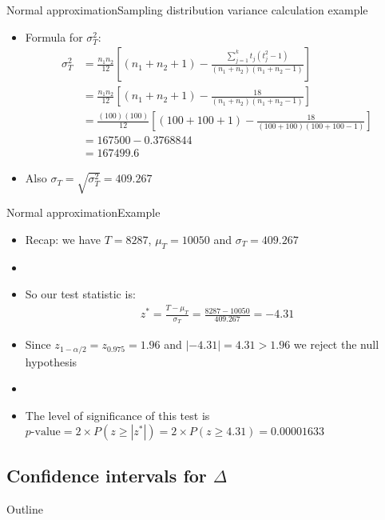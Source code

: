 \documentclass[xcolor=dvipsnames]{beamer}
\begin{document}
\begin{frame}{Normal approximation}{Sampling distribution variance calculation example}
\begin{itemize}
	\item Formula for $\sigma_T^{2}$: 	
	\begin{align*}
	\sigma_T^{2} &= \frac{n_1 n_2}{12}\left[(n_1 +n_2 +1)- \frac{\sum_{j=1}^k t_j (t_j^2-1)}{(n_1+n_2)(n_1+n_2-1)}\right] \\
	&= \frac{n_1 n_2}{12}\left[(n_1 +n_2 +1)- \frac{18}{(n_1+n_2)(n_1+n_2-1)}\right] \\
	&= \frac{(100)(100)}{12}\left[(100 + 100 +1)- \frac{18}{(100+100)(100+100-1)}\right] \\
	&= 167500 - 0.3768844 \\
	&= 167499.6
	\end{align*}
	\item Also $\sigma_T = \sqrt{\sigma_T^2} = 409.267$
\end{itemize}
\end{frame}

\begin{frame}{Normal approximation}{Example}
	\begin{itemize}
		\item Recap: we have $T = 8287$, $\mu_T = 10050$ and $\sigma_T = 409.267$
		\item[]
		\item So our test statistic is:
		\begin{align*}
			z^* =\frac{T- \mu_T}{\sigma_T} = \frac{8287-10050}{409.267} = -4.31
		\end{align*}
		\item Since $z_{1-\alpha/2} = z_{0.975} = 1.96$ and $|-4.31| = 4.31 > 1.96$ we reject the null hypothesis
		\item[]
		\item The level of significance of this test is $p\text{-value}=2 \times P(z \geq |z^*|) = 2 \times P(z \geq 4.31) = 0.00001633$
	\end{itemize}
\end{frame}

\subsection{Confidence intervals for $\Delta$}
\begin{frame}{Outline}
\tableofcontents[currentsection,subsectionstyle=show/shaded/hide]
\end{frame}
\end{document}
